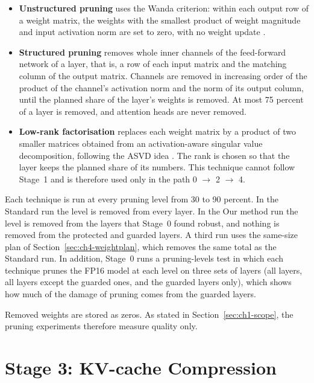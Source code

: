 \documentclass[
11pt, %
english, %
singlespacing, %
headsepline, %
]{MastersDoctoralThesis} %
\begin{document}
\begin{itemize}
  \item \textbf{Unstructured pruning} uses the Wanda criterion: within each output row of a weight matrix, the weights with the smallest product of weight magnitude and input activation norm are set to zero, with no weight update \cite{sun2024wanda}.
  \item \textbf{Structured pruning} removes whole inner channels of the feed-forward network of a layer, that is, a row of each input matrix and the matching column of the output matrix. Channels are removed in increasing order of the product of the channel's activation norm and the norm of its output column, until the planned share of the layer's weights is removed. At most 75 percent of a layer is removed, and attention heads are never removed.
  \item \textbf{Low-rank factorisation} replaces each weight matrix by a product of two smaller matrices obtained from an activation-aware singular value decomposition, following the ASVD idea \cite{yuan2025asvd}. The rank is chosen so that the layer keeps the planned share of its numbers. This technique cannot follow Stage~1 and is therefore used only in the path 0 $\rightarrow$ 2 $\rightarrow$ 4.
\end{itemize}

Each technique is run at every pruning level from 30 to 90 percent. In the Standard run the level is removed from every layer. In the Our method run the level is removed from the layers that Stage~0 found robust, and nothing is removed from the protected and guarded layers. A third run uses the same-size plan of Section~\ref{sec:ch4-weightplan}, which removes the same total as the Standard run. In addition, Stage~0 runs a pruning-levels test in which each technique prunes the FP16 model at each level on three sets of layers (all layers, all layers except the guarded ones, and the guarded layers only), which shows how much of the damage of pruning comes from the guarded layers.

Removed weights are stored as zeros. As stated in Section~\ref{sec:ch1-scope}, the pruning experiments therefore measure quality only.

\section{Stage 3: KV-cache Compression}
\label{sec:ch4-stage3}
\end{document}
